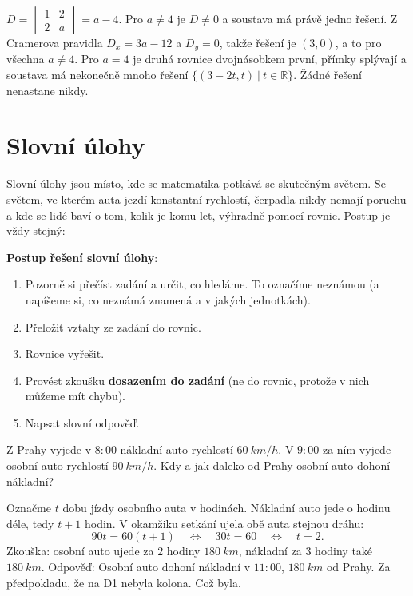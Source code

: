 \begin{solution}
  $D = \begin{vmatrix} 1 & 2\\ 2 & a \end{vmatrix} = a - 4$. Pro $a\neq 4$ je $D\neq 0$ a soustava má právě jedno řešení. Z Cramerova pravidla $D_x = 3a - 12$ a $D_y = 0$, takže řešení je $(3, 0)$, a to pro všechna $a\neq 4$. Pro $a = 4$ je druhá rovnice dvojnásobkem první, přímky splývají a soustava má nekonečně mnoho řešení $\{(3 - 2t, t)\ |\ t\in\mathbb{R}\}$. Žádné řešení nenastane nikdy.
\end{solution}

\section{Slovní úlohy}

Slovní úlohy jsou místo, kde se matematika potkává se skutečným světem. Se světem, ve kterém auta jezdí konstantní rychlostí, čerpadla nikdy nemají poruchu a kde se lidé baví o tom, kolik je komu let, výhradně pomocí rovnic. Postup je vždy stejný:
\begin{definitionbox}
  \textbf{Postup řešení slovní úlohy}:
  \begin{enumerate}
    \item Pozorně si přečíst zadání a určit, co hledáme. To označíme neznámou (a napíšeme si, co neznámá znamená a v jakých jednotkách).
    \item Přeložit vztahy ze zadání do rovnic.
    \item Rovnice vyřešit.
    \item Provést zkoušku \textbf{dosazením do zadání} (ne do rovnic, protože v nich můžeme mít chybu).
    \item Napsat slovní odpověď.
  \end{enumerate}
\end{definitionbox}

\begin{example}[ (pohyb)]
  Z Prahy vyjede v $8{:}00$ nákladní auto rychlostí $60\ \si{km/h}$. V $9{:}00$ za ním vyjede osobní auto rychlostí $90\ \si{km/h}$. Kdy a jak daleko od Prahy osobní auto dohoní nákladní?

  Označme $t$ dobu jízdy osobního auta v hodinách. Nákladní auto jede o hodinu déle, tedy $t + 1$ hodin. V okamžiku setkání ujela obě auta stejnou dráhu:
  \begin{equation*}
    90t = 60(t + 1)\quad\Leftrightarrow\quad 30t = 60\quad\Leftrightarrow\quad t = 2.
  \end{equation*}
  Zkouška: osobní auto ujede za $2$ hodiny $180\ \si{km}$, nákladní za $3$ hodiny také $180\ \si{km}$. Odpověď: Osobní auto dohoní nákladní v $11{:}00$, $180\ \si{km}$ od Prahy. Za předpokladu, že na D1 nebyla kolona. Což byla.
\end{example}

